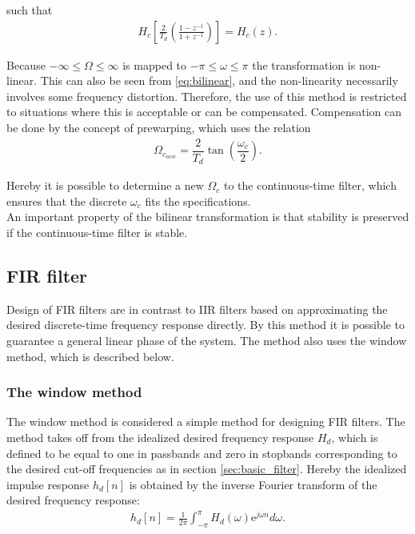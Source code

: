 such that 
\begin{align} \label{eq:bilinear}
H_c\left[\frac{2}{T_d}\left(\frac{1-z^{-1}}{1+z^{-1}}\right)\right]=H_c(z). 
\end{align}

Because $-\infty \leq \Omega \leq \infty $ is mapped to $-\pi \leq \omega \leq \pi$ the transformation is non-linear. This can also be seen from \eqref{eq:bilinear}, and the non-linearity necessarily involves some frequency distortion. Therefore, the use of this method is restricted to situations where this is acceptable or can be compensated. Compensation can be done by the concept of prewarping, which uses the relation
\begin{align*}
\Omega_{c_{new}} = \dfrac{2}{T_d} \tan \left( \dfrac{\omega_c}{2} \right).
\end{align*}

Hereby it is possible to determine a new $\Omega_c$ to the continuous-time filter, which ensures that the discrete $\omega_c$ fits the specifications. \\
An important property of the bilinear transformation is that stability is preserved if the continuous-time filter is stable.

\subsection{FIR filter} \label{subsec:FIR}
Design of FIR filters are in contrast to IIR filters based on approximating the desired discrete-time frequency response directly. By this method it is possible to guarantee a general linear phase of the system. The method also uses the window method, which is described below.

\subsubsection{The window method}
The window method is considered a simple method for designing FIR filters. The method takes off from the idealized desired frequency response $H_d$, which is defined to be equal to one in passbands and zero in stopbands corresponding to the desired cut-off frequencies as in section \ref{sec:basic_filter}. Hereby the idealized impulse response $h_d[n]$ is obtained by the inverse Fourier transform of the desired frequency response:
\begin{align*}
h_d[n]=\frac{1}{2\pi}\int_{-\pi}^{\pi} H_d(\omega)\text{e}^{j\omega n} d\omega.
\end{align*}

